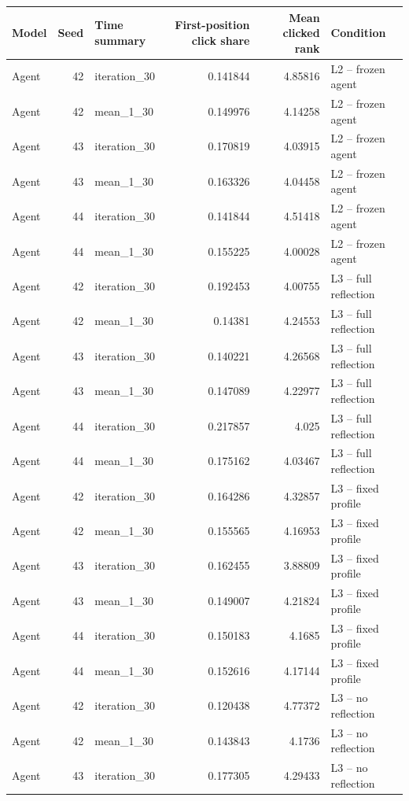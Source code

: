 \begin{table}[htbp!]
\centering
\small
\setlength{\tabcolsep}{3pt}
\renewcommand{\arraystretch}{1.1}
\begin{tabular}{lrlrrl}
\hline
Model & Seed & Time summary & First-position click share & Mean clicked rank & Condition \\
\hline
Agent & 42 & iteration\_30 & 0.141844 & 4.85816 & L2 -- frozen agent \\
Agent & 42 & mean\_1\_30 & 0.149976 & 4.14258 & L2 -- frozen agent \\
Agent & 43 & iteration\_30 & 0.170819 & 4.03915 & L2 -- frozen agent \\
Agent & 43 & mean\_1\_30 & 0.163326 & 4.04458 & L2 -- frozen agent \\
Agent & 44 & iteration\_30 & 0.141844 & 4.51418 & L2 -- frozen agent \\
Agent & 44 & mean\_1\_30 & 0.155225 & 4.00028 & L2 -- frozen agent \\
Agent & 42 & iteration\_30 & 0.192453 & 4.00755 & L3 -- full reflection \\
Agent & 42 & mean\_1\_30 & 0.14381 & 4.24553 & L3 -- full reflection \\
Agent & 43 & iteration\_30 & 0.140221 & 4.26568 & L3 -- full reflection \\
Agent & 43 & mean\_1\_30 & 0.147089 & 4.22977 & L3 -- full reflection \\
Agent & 44 & iteration\_30 & 0.217857 & 4.025 & L3 -- full reflection \\
Agent & 44 & mean\_1\_30 & 0.175162 & 4.03467 & L3 -- full reflection \\
Agent & 42 & iteration\_30 & 0.164286 & 4.32857 & L3 -- fixed profile \\
Agent & 42 & mean\_1\_30 & 0.155565 & 4.16953 & L3 -- fixed profile \\
Agent & 43 & iteration\_30 & 0.162455 & 3.88809 & L3 -- fixed profile \\
Agent & 43 & mean\_1\_30 & 0.149007 & 4.21824 & L3 -- fixed profile \\
Agent & 44 & iteration\_30 & 0.150183 & 4.1685 & L3 -- fixed profile \\
Agent & 44 & mean\_1\_30 & 0.152616 & 4.17144 & L3 -- fixed profile \\
Agent & 42 & iteration\_30 & 0.120438 & 4.77372 & L3 -- no reflection \\
Agent & 42 & mean\_1\_30 & 0.143843 & 4.1736 & L3 -- no reflection \\
Agent & 43 & iteration\_30 & 0.177305 & 4.29433 & L3 -- no reflection \\

\end{tabular}
\end{table}
